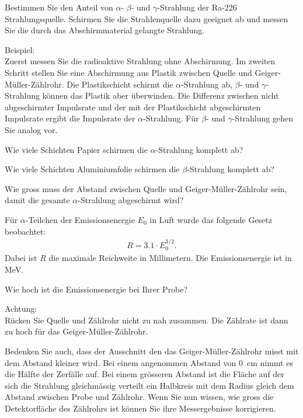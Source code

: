\documentclass[12pt,a4paper, twosite]{article}
\begin{document}
\begin{aufgabe}
	Bestimmen Sie den Anteil von $\alpha$- $\beta$- und $\gamma$-Strahlung der Ra-226 Strahlungsquelle.
	Schirmen Sie die Strahlenquelle dazu geeignet ab und messen Sie die durch das Abschirmmaterial gelangte Strahlung.

	Beispiel:\\
	Zuerst messen Sie die radioaktive Strahlung ohne Abschirmung. 
	Im zweiten Schritt stellen Sie eine Abschirmung aus Plastik zwischen Quelle und Geiger-Müller-Zählrohr.
	Die Plastikschicht schirmt die $\alpha$-Strahlung ab, $\beta$- und $\gamma$-Strahlung können das Plastik aber überwinden.
	Die Differenz zwischen nicht abgeschirmter Impulsrate und der mit der Plastikschicht abgeschirmten Impulsrate ergibt die
	Impulsrate der $\alpha$-Strahlung.
	Für $\beta$- und $\gamma$-Strahlung gehen Sie analog vor.
\end{aufgabe}

\begin{aufgabe}
	Wie viele Schichten Papier schirmen die $\alpha$-Strahlung komplett ab?
\end{aufgabe}

\begin{aufgabe}
	Wie viele Schichten Aluminiumfolie schirmen die $\beta$-Strahlung komplett ab?
\end{aufgabe}

\begin{aufgabe}
	Wie gross muss der Abstand zwischen Quelle und Geiger-Müller-Zählrohr sein, 
	damit die gesamte $\alpha$-Strahlung abgeschirmt wird?

	Für $\alpha$-Teilchen der Emissionsenergie $E_0$ in Luft wurde das folgende Gesetz beobachtet:
	\begin{eqnarray*}
		R = \num{3.1} \cdot E_0^{3/2}\text{.}
	\end{eqnarray*}
	Dabei ist $R$ die maximale Reichweite in Millimetern. Die Emissionsenergie ist in MeV.

	Wie hoch ist die Emissionsenergie bei Ihrer Probe? 

	Achtung:\\
	Rücken Sie Quelle und Zählrohr nicht zu nah zusammen. Die Zählrate ist dann zu hoch für das Geiger-Müller-Zählrohr.

	Bedenken Sie auch, dass der Ausschnitt den das Geiger-Müller-Zählrohr misst mit dem Abstand kleiner wird.
	Bei einem angenommen Abstand von \SI{0}{cm} nimmt es die Hälfte der Zerfälle auf.
	Bei einem grösseren Abstand ist die Fläche auf der sich die Strahlung gleichmässig verteilt 
	ein Halbkreis mit dem Radius gleich dem Abstand zwischen Probe und Zählrohr.
	Wenn Sie nun wissen, wie gross die Detektorfläche des Zählrohrs ist können Sie ihre Messergebnisse korrigieren.

\end{aufgabe}
\end{document}

